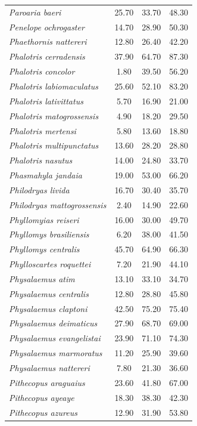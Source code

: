 \documentclass[12pt,openright,oneside,a4paper,english]{abntex2}
\begin{document}
\begin{longtable}{lccc}
	\textit{Paroaria baeri}&25.70 &33.70 &48.30 \\
	\textit{Penelope ochrogaster}&14.70 &28.90 &50.30 \\
	\textit{Phaethornis nattereri}&12.80 &26.40 &42.20 \\
	\textit{Phalotris cerradensis}&37.90 &64.70 &87.30 \\
	\textit{Phalotris concolor}&1.80 &39.50 &56.20 \\
	\textit{Phalotris labiomaculatus}&25.60 &52.10 &83.20 \\
	\textit{Phalotris lativittatus}&5.70 &16.90 &21.00 \\
	\textit{Phalotris matogrossensis}&4.90 &18.20 &29.50 \\
	\textit{Phalotris mertensi}&5.80 &13.60 &18.80 \\
	\textit{Phalotris multipunctatus}&13.60 &28.20 &28.80 \\
	\textit{Phalotris nasutus}&14.00 &24.80 &33.70 \\
	\textit{Phasmahyla jandaia}&19.00 &53.00 &66.20 \\
	\textit{Philodryas livida}&16.70 &30.40 &35.70 \\
	\textit{Philodryas mattogrossensis}&2.40 &14.90 &22.60 \\
	\textit{Phyllomyias reiseri}&16.00 &30.00 &49.70 \\
	\textit{Phyllomys brasiliensis}&6.20 &38.00 &41.50 \\
	\textit{Phyllomys centralis}&45.70 &64.90 &66.30 \\
	\textit{Phylloscartes roquettei}&7.20 &21.90 &44.10 \\
	\textit{Physalaemus atim}&13.10 &33.10 &34.70 \\
	\textit{Physalaemus centralis}&12.80 &28.80 &45.80 \\
	\textit{Physalaemus claptoni}&42.50 &75.20 &75.40 \\
	\textit{Physalaemus deimaticus}&27.90 &68.70 &69.00 \\
	\textit{Physalaemus evangelistai}&23.90 &71.10 &74.30 \\
	\textit{Physalaemus marmoratus}&11.20 &25.90 &39.60 \\
	\textit{Physalaemus nattereri}&7.80 &21.30 &36.60 \\
	\textit{Pithecopus araguaius}&23.60 &41.80 &67.00 \\
	\textit{Pithecopus ayeaye}&18.30 &38.30 &42.30 \\
	\textit{Pithecopus azureus}&12.90 &31.90 &53.80 \\

\end{longtable}
\end{document}
